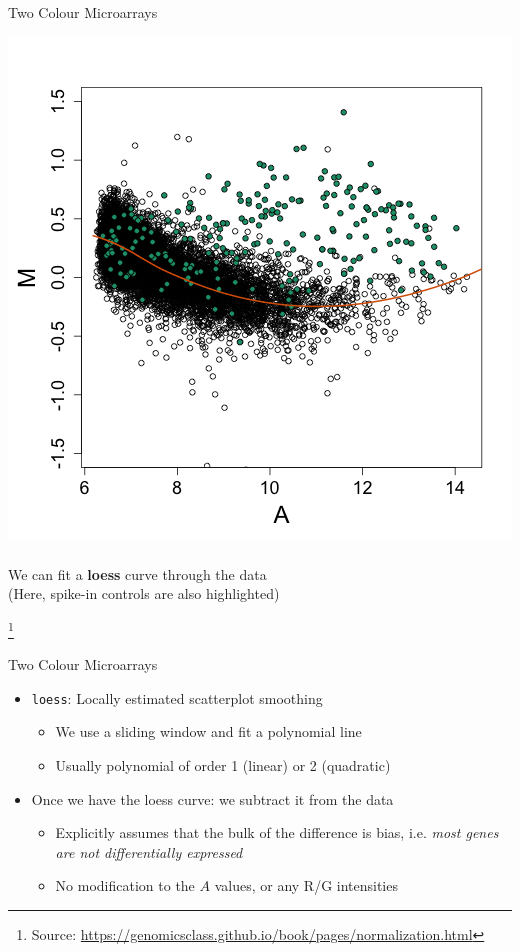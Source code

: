 \documentclass[aspectratio=169,11pt]{beamer}
\newcommand\blfootnote[1]{%
  \begingroup
  \renewcommand\thefootnote{}\footnote{#1}%
  \addtocounter{footnote}{-1}%
  \endgroup
}
\begin{document}
\begin{frame}{Two Colour Microarrays}

	\begin{center}
		\includegraphics[scale=0.3]{figures/MA_plot_loess.png} 
		~\\
		We can fit a \textbf{loess} curve through the data\\
		(Here, spike-in controls are also highlighted)
	\end{center}

\blfootnote{Source: \url{https://genomicsclass.github.io/book/pages/normalization.html}}	


\end{frame}

\begin{frame}{Two Colour Microarrays}

	\begin{itemize}
		\item \texttt{loess}: Locally estimated scatterplot smoothing
		\begin{itemize}
			\item We use a sliding window and fit a polynomial line
			\item Usually polynomial of order 1 (linear) or 2 (quadratic)
		\end{itemize}
		\item Once we have the loess curve: we subtract it from the data
		\begin{itemize}
			\item Explicitly assumes that the bulk of the difference is bias, i.e. \textit{most genes are not differentially expressed}
			\item No modification to the $A$ values, or any R/G intensities
		\end{itemize}
	\end{itemize}


\end{frame}
\end{document}
